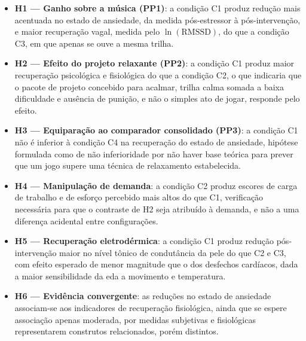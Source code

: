 \begin{itemize}
    \item \textbf{H1 --- Ganho sobre a música (PP1)}: a condição C1 produz redução mais acentuada no estado de ansiedade, da medida pós-estressor à pós-intervenção, e maior recuperação vagal, medida pelo $\ln(\mathrm{RMSSD})$, do que a condição C3, em que apenas se ouve a mesma trilha.

    \item \textbf{H2 --- Efeito do projeto relaxante (PP2)}: a condição C1 produz maior recuperação psicológica e fisiológica do que a condição C2, o que indicaria que o pacote de projeto concebido para acalmar, trilha calma somada a baixa dificuldade e ausência de punição, e não o simples ato de jogar, responde pelo efeito.

    \item \textbf{H3 --- Equiparação ao comparador consolidado (PP3)}: a condição C1 não é inferior à condição C4 na recuperação do estado de ansiedade, hipótese formulada como de não inferioridade por não haver base teórica para prever que um jogo supere uma técnica de relaxamento estabelecida.

    \item \textbf{H4 --- Manipulação de demanda}: a condição C2 produz escores de carga de trabalho e de esforço percebido mais altos do que C1, verificação necessária para que o contraste de H2 seja atribuído à demanda, e não a uma diferença acidental entre configurações.

    \item \textbf{H5 --- Recuperação eletrodérmica}: a condição C1 produz redução pós-intervenção maior no nível tônico de condutância da pele do que C2 e C3, com efeito esperado de menor magnitude que o dos desfechos cardíacos, dada a maior sensibilidade da \gls{eda} a movimento e temperatura.

    \item \textbf{H6 --- Evidência convergente}: as reduções no estado de ansiedade associam-se aos indicadores de recuperação fisiológica, ainda que se espere associação apenas moderada, por medidas subjetivas e fisiológicas representarem construtos relacionados, porém distintos.
\end{itemize}


